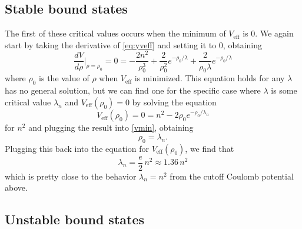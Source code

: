 \documentclass[12pt,twoside]{reedthesis}
\begin{document}
\subsection{Stable bound states}
The first of these critical values occurs when the minimum of $V_{\mathrm{eff}}$ is 0. We again start by taking the derivative of \eqref{eq:yveff} and setting it to 0, obtaining
\begin{equation}
\frac{dV}{d\rho}\Big |_{\rho = \rho_0} =0 = -\frac{2n^2}{\rho_0^3} + \frac{2}{\rho_0^2}e^{-\rho_0/\lambda} + \frac{2}{\rho_0 \lambda} e^{-\rho_0/\lambda}
\label{vmin}
\end{equation}
where $\rho_0$ is the value of $\rho$ when $V_{\mathrm{eff}}$ is minimized. This equation holds for any $\lambda$ has no general solution, but we can find one for the specific case where $\lambda$ is some critical value $\lambda_n$ and $V_{\mathrm{eff}}(\rho_0) = 0$ by solving the equation
\begin{equation}
V_{\mathrm{eff}}(\rho_0)=0 = n^2 - 2\rho_0 e^{-\rho_0/\lambda_n} 
\end{equation}
for $n^2$
and plugging the result into \eqref{vmin}, obtaining
\begin{equation}
\rho_0 = \lambda_n \mbox{.}
\end{equation}
Plugging this back into the equation for $V_{\mathrm{eff}}(\rho_0)$, we find that
\begin{equation}
\lambda_n=\frac{e}{2}\, n^2\approx 1.36\, n^2
\label{eq:stable}
\end{equation}
which is pretty close to the behavior $\lambda_{n} = n^2$ from the cutoff Coulomb potential above. 

\subsection{Unstable bound states}
\end{document}
